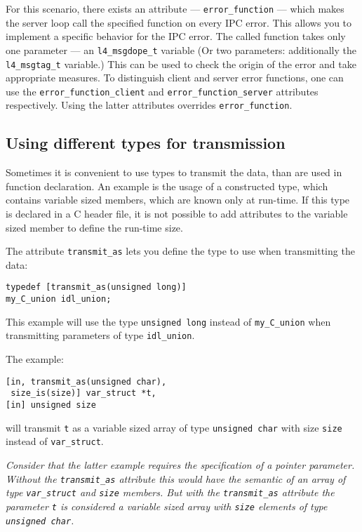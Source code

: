 For this scenario, there exists an attribute --- \verb|error_function| ---
which makes the server loop call the specified function on every IPC error.
This allows you to implement a specific behavior for the IPC error.  The
called function takes only one parameter --- an \verb|l4_msgdope_t| variable
(Or two parameters: additionally the \verb|l4_msgtag_t| variable.)  This can
be used to check the origin of the error and take appropriate measures.  To
distinguish client and server error functions, one can use the
\verb|error_function_client| and \verb|error_function_server| attributes
respectively. Using the latter attributes overrides \verb|error_function|.



\subsection{Using different types for transmission}

Sometimes it is convenient to use types to transmit the data, than are used in
function declaration.  An example is the usage of a constructed type, which
contains variable sized members, which are known only at run-time.  If this
type is declared in a C header file, it is not possible to add attributes to
the variable sized member to define the run-time size.

The attribute \verb|transmit_as| lets you define the type to use
when transmitting the data:
\begin{verbatim}
typedef [transmit_as(unsigned long)]
my_C_union idl_union;
\end{verbatim}
This example will use the type \verb|unsigned long| instead of
\verb|my_C_union| when transmitting parameters of type \verb|idl_union|.

The example:
\begin{verbatim}
[in, transmit_as(unsigned char),
 size_is(size)] var_struct *t,
[in] unsigned size
\end{verbatim}
will transmit \verb|t| as a variable sized array of type \verb|unsigned char|
with size \verb|size| instead of \verb|var_struct|.

{\em Consider that the latter example requires the specification of a pointer
parameter. Without the \verb|transmit_as| attribute this would have the
semantic of an array of type \verb|var_struct| and \verb|size| members. But
with the \verb|transmit_as| attribute the parameter \verb|t| is considered a
variable sized array with \verb|size| elements of type \verb|unsigned char|.}

